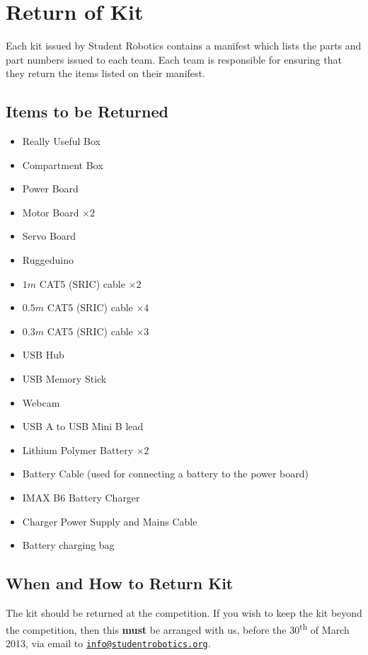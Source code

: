 \section {Return of Kit}
\label{sec:kit-return}

Each kit issued by Student Robotics contains a manifest which lists the parts and part numbers issued to each team.
Each team is responsible for ensuring that they return the items listed on their manifest.

\subsection {Items to be Returned}

\begin{itemize}
 \item Really Useful Box
 \item Compartment Box
\end{itemize}

\begin{itemize}
 \item Power Board
 \item Motor Board $\times 2$
 \item Servo Board
 \item Ruggeduino
 \item $  1m$ CAT5 (SRIC) cable $\times 2$
 \item $0.5m$ CAT5 (SRIC) cable $\times 4$
 \item $0.3m$ CAT5 (SRIC) cable $\times 3$
\end{itemize}

\begin{itemize}
 \item USB Hub
 \item USB Memory Stick
 \item Webcam
 \item USB A to USB Mini B lead
\end{itemize}

\begin{itemize}
 \item Lithium Polymer Battery $\times 2$
 \item Battery Cable (used for connecting a battery to the power board)
 \item IMAX B6 Battery Charger
 \item Charger Power Supply and Mains Cable
 \item Battery charging bag
\end{itemize}

\subsection {When and How to Return Kit}

The kit should be returned at the competition.
If you wish to keep the kit beyond the competition, then this \textbf{must} be arranged with us,
 before the 30\textsuperscript{th} of March 2013, via email to \href{mailto:info@studentrobotics.org}{\nolinkurl{info@studentrobotics.org}}.
